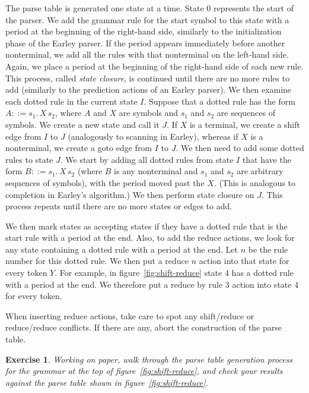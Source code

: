 \documentclass[7x10]{TimesAPriori_MIT}%
\newtheorem{exercise}[theorem]{Exercise}
\numberwithin{theorem}{chapter}
\numberwithin{definition}{chapter}
\numberwithin{equation}{chapter}
\begin{document}
{The parse table is generated one state at a time. State 0 represents
the start of the parser. We add the grammar rule for the start symbol
to this state with a period at the beginning of the right-hand side,
similarly to the initialization phase of the Earley parser.  If the
period appears immediately before another nonterminal, we add all the
rules with that nonterminal on the left-hand side. Again, we place a
period at the beginning of the right-hand side of each new
rule. This process, called \emph{state closure}, is continued
until there are no more rules to add (similarly to the prediction
actions of an Earley parser). We then examine each dotted rule in the
current state $I$. Suppose that a dotted rule has the form $A ::=
s_1.\,X \,s_2$, where $A$ and $X$ are symbols and $s_1$ and $s_2$
are sequences of symbols. We create a new state and call it $J$.  If $X$
is a terminal, we create a shift edge from $I$ to $J$ (analogously to
scanning in Earley), whereas if $X$ is a nonterminal, we create a
goto edge from $I$ to $J$.  We then need to add some dotted rules to
state $J$. We start by adding all dotted rules from state $I$ that
have the form $B ::= s_1.\,X\,s_2$ (where $B$ is any nonterminal and
$s_1$ and $s_2$ are arbitrary sequences of symbols), with
the period moved past the $X$.  (This is analogous to completion in
Earley's algorithm.)  We then perform state closure on $J$.  This
process repeats until there are no more states or edges to add.

We then mark states as accepting states if they have a dotted rule
that is the start rule with a period at the end.  Also, to add
the reduce actions, we look for any state containing a dotted rule
with a period at the end. Let $n$ be the rule number for this dotted
rule. We then put a reduce $n$ action into that state for every token
$Y$. For example, in figure~\ref{fig:shift-reduce} state 4 has a
dotted rule with a period at the end. We therefore put a reduce by
rule 3 action into state 4 for every
token.

When inserting reduce actions, take care to spot any shift/reduce or
reduce/reduce conflicts. If there are any, abort the construction of
the parse table.


\begin{exercise}
  \normalfont\normalsize
%
Working on paper, walk through the parse table generation process for
the grammar at the top of figure~\ref{fig:shift-reduce}, and check
your results against the parse table shown in
figure~\ref{fig:shift-reduce}.
\end{exercise}


}
\end{document}
